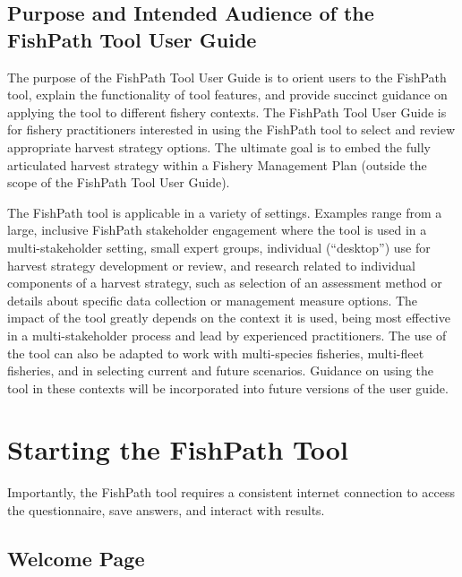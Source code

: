 \documentclass[11pt,]{book}
\begin{document}
\hypertarget{purpose-and-intended-audience-of-the-fishpath-tool-user-guide}{%
\section{Purpose and Intended Audience of the FishPath Tool User
Guide}\label{purpose-and-intended-audience-of-the-fishpath-tool-user-guide}}

The purpose of the FishPath Tool User Guide is to orient users to the
FishPath tool, explain the functionality of tool features, and provide
succinct guidance on applying the tool to different fishery contexts.
The FishPath Tool User Guide is for fishery practitioners interested in
using the FishPath tool to select and review appropriate harvest
strategy options. The ultimate goal is to embed the fully articulated
harvest strategy within a Fishery Management Plan (outside the scope of
the FishPath Tool User Guide).

The FishPath tool is applicable in a variety of settings. Examples range
from a large, inclusive FishPath stakeholder engagement where the tool
is used in a multi-stakeholder setting, small expert groups, individual
(``desktop'') use for harvest strategy development or review, and
research related to individual components of a harvest strategy, such as
selection of an assessment method or details about specific data
collection or management measure options. The impact of the tool greatly
depends on the context it is used, being most effective in a
multi-stakeholder process and lead by experienced practitioners. The use
of the tool can also be adapted to work with multi-species fisheries,
multi-fleet fisheries, and in selecting current and future scenarios.
Guidance on using the tool in these contexts will be incorporated into
future versions of the user guide.

\hypertarget{starting-the-fishpath-tool}{%
\chapter{Starting the FishPath Tool}\label{starting-the-fishpath-tool}}

Importantly, the FishPath tool requires a consistent internet connection
to access the questionnaire, save answers, and interact with results.

\hypertarget{welcome-page}{%
\section{Welcome Page}\label{welcome-page}}
\end{document}
